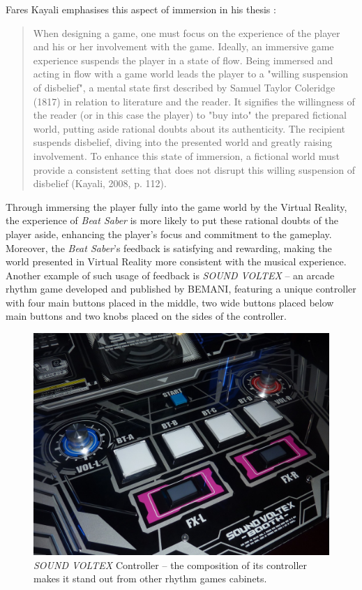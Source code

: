 Fares Kayali emphasises this aspect of immersion in his thesis \cite{faresplayingmusic}:

\begin{quote}
    When designing a game, one must focus on the experience of the player and his or her involvement with the game. Ideally, an immersive game experience suspends the player in a state of flow. Being immersed and acting in flow with a game world leads the player to a "willing suspension of disbelief", a mental state first described by Samuel Taylor Coleridge (1817) in relation to literature and the reader. It signifies the willingness of the reader (or in this case the player) to "buy into" the prepared fictional world, putting aside rational doubts about its authenticity. The recipient suspends disbelief, diving into the presented world and greatly raising involvement. To enhance this state of immersion, a fictional world must provide a consistent setting that does not disrupt this willing suspension of disbelief (Kayali, 2008, p. 112).
\end{quote}

Through immersing the player fully into the game world by the Virtual Reality, the experience of \textit{Beat Saber} is more likely to put these rational doubts of the player aside, enhancing the player's focus and commitment to the gameplay. Moreover, the \textit{Beat Saber}'s feedback is satisfying and rewarding, making the world presented in Virtual Reality more consistent with the musical experience.
Another example of such usage of feedback is \textit{SOUND VOLTEX} -- an arcade rhythm game developed and published by BEMANI, featuring a unique controller with four main buttons placed in the middle, two wide buttons placed below main buttons and two knobs placed on the sides of the controller.

\begin{figure}[h]
    \centering\includegraphics[scale=0.5]{obrazki/sdvxcontroller.jpeg}
    \caption{\textit{SOUND VOLTEX} Controller -- the composition of its controller makes it stand out from other rhythm games cabinets.\cite{sdvxcontroller}}
    \label{fig:sdvx}
\end{figure}

